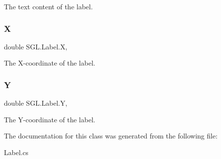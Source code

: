 The text content of the label. 

\mbox{\label{class_s_g_l_1_1_label_adfba11f4ead1d6dd29785a7530acfca0}} 
\subsubsection{\texorpdfstring{X}{X}}
{\footnotesize\ttfamily double S\+G\+L.\+Label.\+X\hspace{0.3cm}{\ttfamily [get]}, {\ttfamily [set]}}



The X-\/coordinate of the label. 

\mbox{\label{class_s_g_l_1_1_label_a7c8067fe0098721a4a9cb6bd187e005d}} 
\subsubsection{\texorpdfstring{Y}{Y}}
{\footnotesize\ttfamily double S\+G\+L.\+Label.\+Y\hspace{0.3cm}{\ttfamily [get]}, {\ttfamily [set]}}



The Y-\/coordinate of the label. 



The documentation for this class was generated from the following file\+:\begin{DoxyCompactItemize}
\item 
Label.\+cs\end{DoxyCompactItemize}

